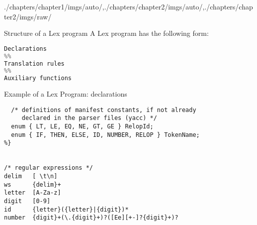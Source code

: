 \begin{graphicspathcontext}{{./chapters/chapter1/imgs/auto/},{./chapters/chapter2/imgs/auto/},{./chapters/chapter2/imgs/raw/}}
\begin{bibunit}[apalike]
\begin{frame}[t,fragile]{Structure of a Lex program}
	A Lex program has the following form:
		\begin{lstlisting}[language=python]
Declarations
%%
Translation rules
%%
Auxiliary functions
		\end{lstlisting}
\end{frame}

\begin{frame}[fragile,background=9]{{Example of a Lex Program:} declarations}
	\begin{lstlisting}[style=lststyle-c]
%{
  /* definitions of manifest constants, if not already
     declared in the parser files (yacc) */
  enum { LT, LE, EQ, NE, GT, GE	} RelopId;
  enum { IF, THEN, ELSE, ID, NUMBER, RELOP } TokenName;
%}


/* regular expressions */
delim   [ \t\n]
ws      {delim}+
letter  [A-Za-z]
digit   [0-9]
id      {letter}({letter}|{digit})*
number  {digit}+(\.{digit}+)?([Ee][+-]?{digit}+)?


\end{lstlisting}
\end{frame}
\end{bibunit}
\end{graphicspathcontext}

